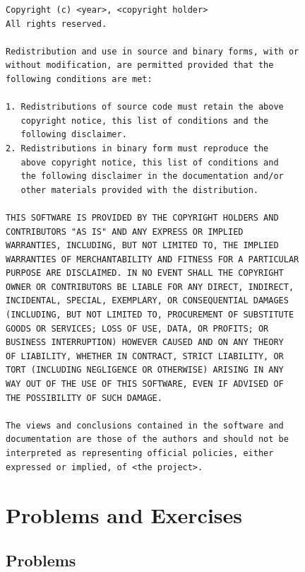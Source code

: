 \begin{lstlisting}[float,label=code:bsdlicense,caption={[2-clause
BSD license]The simplified, or 2-clause, BSD license.
Nice and terse, huh?  In contrast, the \gls{gnu}
\gls{gpl} clocks in at 11 full text pages.}] 
Copyright (c) <year>, <copyright holder>
All rights reserved.

Redistribution and use in source and binary forms, with or
without modification, are permitted provided that the
following conditions are met:

1. Redistributions of source code must retain the above
   copyright notice, this list of conditions and the
   following disclaimer.
2. Redistributions in binary form must reproduce the
   above copyright notice, this list of conditions and
   the following disclaimer in the documentation and/or
   other materials provided with the distribution.

THIS SOFTWARE IS PROVIDED BY THE COPYRIGHT HOLDERS AND
CONTRIBUTORS "AS IS" AND ANY EXPRESS OR IMPLIED
WARRANTIES, INCLUDING, BUT NOT LIMITED TO, THE IMPLIED
WARRANTIES OF MERCHANTABILITY AND FITNESS FOR A PARTICULAR
PURPOSE ARE DISCLAIMED. IN NO EVENT SHALL THE COPYRIGHT
OWNER OR CONTRIBUTORS BE LIABLE FOR ANY DIRECT, INDIRECT,
INCIDENTAL, SPECIAL, EXEMPLARY, OR CONSEQUENTIAL DAMAGES
(INCLUDING, BUT NOT LIMITED TO, PROCUREMENT OF SUBSTITUTE
GOODS OR SERVICES; LOSS OF USE, DATA, OR PROFITS; OR
BUSINESS INTERRUPTION) HOWEVER CAUSED AND ON ANY THEORY
OF LIABILITY, WHETHER IN CONTRACT, STRICT LIABILITY, OR
TORT (INCLUDING NEGLIGENCE OR OTHERWISE) ARISING IN ANY
WAY OUT OF THE USE OF THIS SOFTWARE, EVEN IF ADVISED OF
THE POSSIBILITY OF SUCH DAMAGE.

The views and conclusions contained in the software and
documentation are those of the authors and should not be
interpreted as representing official policies, either
expressed or implied, of <the project>.
\end{lstlisting}

\pagebreak

\chapter*{Problems and Exercises}
\section*{Problems}

